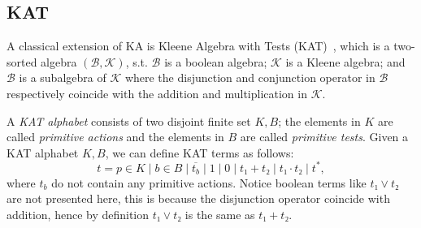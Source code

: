 \subsection{KAT}

A classical extension of KA is Kleene Algebra with Tests (KAT)~\cite{Kozen_Smith_1997}, 
which is a two-sorted algebra \((ℬ, 𝒦)\), s.t. 
\(ℬ\) is a boolean algebra; \(𝒦\) is a Kleene algebra; 
and \(ℬ\) is a subalgebra of \(𝒦\) where the disjunction and conjunction operator in \(ℬ\)
respectively coincide with the addition and multiplication in \(𝒦\).

A \emph{KAT alphabet} consists of two disjoint finite set \(K, B\);  
the elements in \(K\) are called \emph{primitive actions} 
and the elements in \(B\) are called \emph{primitive tests}.
Given a KAT alphabet \(K, B\), we can define KAT terms as follows:
\[t = p ∈ K ∣ b ∈ B ∣ \overline{t_b} ∣ 1 ∣ 0 ∣ t₁ + t₂ ∣ t₁ ⋅ t₂ ∣ t^*,\]
where \(t_b\) do not contain any primitive actions.
Notice boolean terms like \(t₁ ∨ t₂\) are not presented here, 
this is because the disjunction operator coincide with addition, 
hence by definition \(t₁ ∨ t₂\) is the same as \(t₁ + t₂\).